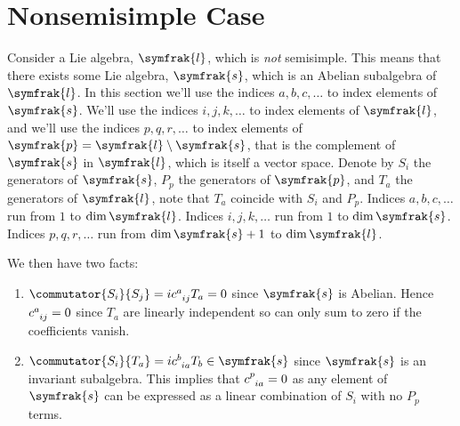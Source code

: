 \documentclass[fleqn]{NotesClass}
\renewcommand{\lie}[1]{\symfrak{#1}}
\begin{document}
    \section{Nonsemisimple Case}
    Consider a Lie algebra, \(\lie{l}\), which is \emph{not} semisimple.
    This means that there exists some Lie algebra, \(\lie{s}\), which is an Abelian subalgebra of \(\lie{l}\).
    In this section we'll use the indices \(a, b, c, \dotsc\) to index elements of \(\lie{s}\).
    We'll use the indices \(i, j, k, \dotsc\) to index elements of \(\lie{l}\), and we'll use the indices \(p, q, r, \dotsc\) to index elements of \(\lie{p} = \lie{l} \setminus \lie{s}\), that is the complement of \(\lie{s}\) in \(\lie{l}\), which is itself a vector space.
    Denote by \(S_i\) the generators of \(\lie{s}\), \(P_p\) the generators of \(\lie{p}\), and \(T_a\) the generators of \(\lie{l}\), note that \(T_a\) coincide with \(S_i\) and \(P_p\).
    Indices \(a, b, c, \dotsc\) run from \(1\) to \(\dim \lie{l}\).
    Indices \(i, j, k, \dotsc\) run from \(1\) to \(\dim \lie{s}\).
    Indices \(p, q, r, \dotsc\) run from \(\dim\lie{s} + 1\) to \(\dim\lie{l}\).
    
    We then have two facts:
    \begin{enumerate}
        \item \(\commutator{S_i}{S_j} = i\tensor{c}{^a_{ij}}T_a = 0\) since \(\lie{s}\) is Abelian.
        Hence \(\tensor{c}{^a_{ij}} = 0\) since \(T_a\) are linearly independent so can only sum to zero if the coefficients vanish.
        \item \(\commutator{S_i}{T_a} = i\tensor{c}{^b_{ia}}T_b \in \lie{s}\) since \(\lie{s}\) is an invariant subalgebra.
        This implies that \(\tensor{c}{^p_{ia}} = 0\) as any element of \(\lie{s}\) can be expressed as a linear combination of \(S_i\) with no \(P_p\) terms.
    \end{enumerate}
    
\end{document}
